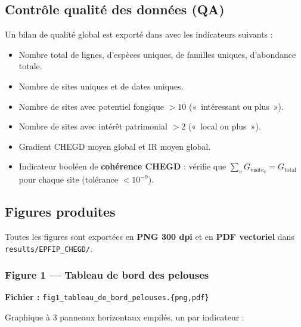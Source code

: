 \documentclass[11pt,a4paper]{article}
\begin{document}
\subsection{Contrôle qualité des données (QA)}

Un bilan de qualité global est exporté dans  avec les indicateurs suivants :

\begin{itemize}
  \item Nombre total de lignes, d'espèces uniques, de familles uniques, d'abondance totale.
  \item Nombre de sites uniques et de dates uniques.
  \item Nombre de sites avec potentiel fongique $> 10$ («~intéressant ou plus~»).
  \item Nombre de sites avec intérêt patrimonial $> 2$ («~local ou plus~»).
  \item Gradient CHEGD moyen global et IR moyen global.
  \item Indicateur booléen de \textbf{cohérence CHEGD} : vérifie que $\sum_v G_{\text{visite}_v} = G_{\text{total}}$ pour chaque site (tolérance $< 10^{-9}$).
\end{itemize}

\subsection{Figures produites}

Toutes les figures sont exportées en \textbf{PNG 300 dpi} et en \textbf{PDF vectoriel} dans
\texttt{results/EPFIP\_CHEGD/}.

\subsubsection{Figure 1 — Tableau de bord des pelouses}

\textbf{Fichier :} \texttt{fig1\_tableau\_de\_bord\_pelouses.\{png,pdf\}}

Graphique à 3 panneaux horizontaux empilés, un par indicateur :
\end{document}
